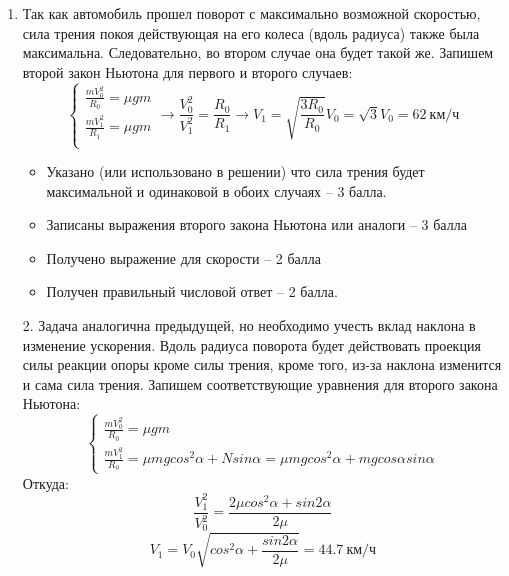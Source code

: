 \solutionSection

\begin{enumerate}
    \item Так как автомобиль прошел поворот с максимально возможной скоростью, сила трения покоя действующая на его колеса (вдоль радиуса) также была максимальна. Следовательно, во втором случае она будет такой же.
    Запишем второй закон Ньютона для первого и второго случаев:
    $$ \left\{
        \begin{aligned}
        \frac{mV_0^2}{R_0} =\mu gm\\
        \frac{mV_1^2}{R_1} =\mu gm\\
        \end{aligned}
    \right. \rightarrow \frac{V_0^2}{V_1^2}=\frac{R_0}{R_1} \rightarrow V_1 = \sqrt{\frac{3R_0}{R_0}} V_0= \sqrt{3} V_0=62 \: \text{км/ч}$$

    \markSection

    \begin{itemize}
        \item Указано (или использовано в решении) что сила трения будет максимальной и одинаковой в обоих случаях – 3 балла.
        \item Записаны выражения второго закона Ньютона или аналоги – 3 балла
        \item Получено выражение для скорости – 2 балла
        \item Получен правильный числовой ответ – 2 балла.
    \end{itemize}

    \item[2.] Задача аналогична предыдущей, но необходимо учесть вклад наклона в изменение ускорения. Вдоль радиуса поворота будет действовать проекция силы реакции опоры кроме силы трения, кроме того, из-за наклона изменится и сама сила трения. Запишем соответствующие уравнения для второго закона Ньютона:
    $$ \left\{
        \begin{aligned}
            \frac{mV_0^2}{R_0} =  \mu gm\\
            \frac{mV_1^2}{R_0} = \mu mg cos^2  \alpha+N sin \alpha= \mu mg cos^2 \alpha+mg cos \alpha sin\alpha
        \end{aligned}
    \right. $$
    Откуда:
    $$\frac{V_1^2}{V_0^2}=\frac{2 \mu  cos^2 \alpha+sin2 \alpha}{2 \mu}$$ 
    $$V_1=V_0 \sqrt{cos^2 \alpha+\frac{sin2\alpha}{2 \mu}} =44.7 \: \text{км/ч}$$

    \markSection


\end{enumerate}
